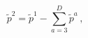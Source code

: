 \begin{equation}
\label{vconstraint}
\tilde p^2=\tilde p^1-\sum_{a=3}^D\tilde     p^a	\, ,
\end{equation}

